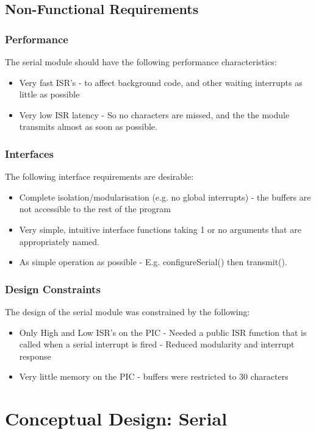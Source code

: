 \documentclass[]{report}
\begin{document}
\subsection{Non-Functional Requirements}
\subsubsection{Performance}
The serial module should have the following performance characteristics:
\begin{itemize}
	\item Very fast ISR's - to affect background code, and other waiting interrupts as little as possible
	\item Very low ISR latency - So no characters are missed, and the the module transmits almost as soon as possible.
\end{itemize}

\subsubsection{Interfaces}
The following interface requirements are desirable:
\begin{itemize}
	\item Complete isolation/modularisation (e.g. no global interrupts) - the buffers are not accessible to the rest of the program
	\item Very simple, intuitive interface functions taking 1 or no arguments that are appropriately named.
	\item As simple operation as possible - E.g. configureSerial() then transmit().
\end{itemize}

\subsubsection{Design Constraints}
The design of the serial module was constrained by the following:
\begin{itemize}
	\item Only High and Low ISR's on the PIC - Needed a public ISR function that is called when a serial interrupt is fired - Reduced modularity and interrupt response
	\item Very little memory on the PIC - buffers were restricted to 30 characters
\end{itemize}

\section{Conceptual Design: Serial}
\end{document}
